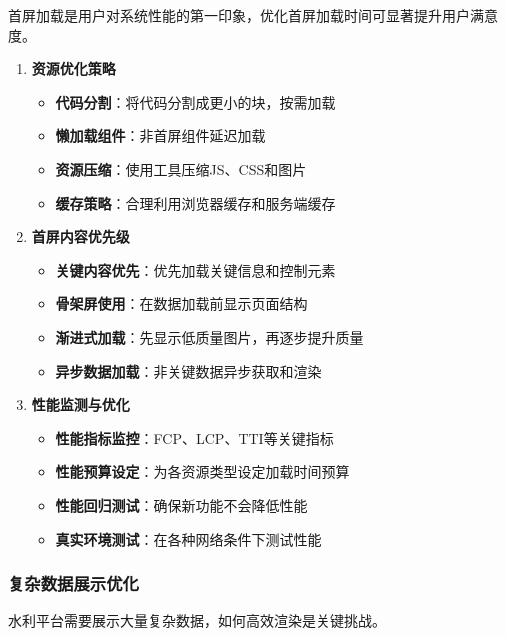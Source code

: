 首屏加载是用户对系统性能的第一印象，优化首屏加载时间可显著提升用户满意度。

\begin{enumerate}
\def\labelenumi{\arabic{enumi}.}
\tightlist
\item
  \textbf{资源优化策略}

  \begin{itemize}
  \tightlist
  \item
    \textbf{代码分割}：将代码分割成更小的块，按需加载
  \item
    \textbf{懒加载组件}：非首屏组件延迟加载
  \item
    \textbf{资源压缩}：使用工具压缩JS、CSS和图片
  \item
    \textbf{缓存策略}：合理利用浏览器缓存和服务端缓存
  \end{itemize}
\item
  \textbf{首屏内容优先级}

  \begin{itemize}
  \tightlist
  \item
    \textbf{关键内容优先}：优先加载关键信息和控制元素
  \item
    \textbf{骨架屏使用}：在数据加载前显示页面结构
  \item
    \textbf{渐进式加载}：先显示低质量图片，再逐步提升质量
  \item
    \textbf{异步数据加载}：非关键数据异步获取和渲染
  \end{itemize}
\item
  \textbf{性能监测与优化}

  \begin{itemize}
  \tightlist
  \item
    \textbf{性能指标监控}：FCP、LCP、TTI等关键指标
  \item
    \textbf{性能预算设定}：为各资源类型设定加载时间预算
  \item
    \textbf{性能回归测试}：确保新功能不会降低性能
  \item
    \textbf{真实环境测试}：在各种网络条件下测试性能
  \end{itemize}
\end{enumerate}

\subsubsection{复杂数据展示优化}\label{ux590dux6742ux6570ux636eux5c55ux793aux4f18ux5316}

水利平台需要展示大量复杂数据，如何高效渲染是关键挑战。

